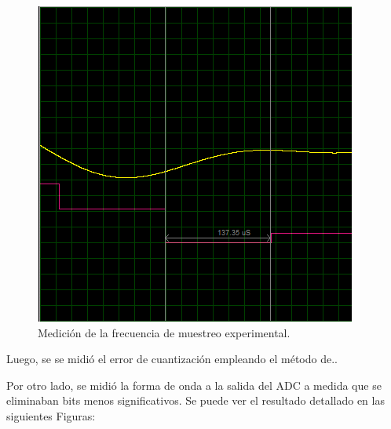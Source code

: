 \begin{multicols}{2}
\begin{figure}[H]
\centering
\includegraphics[width=0.9\linewidth]{ImagenesEjercicio1/med2.png}
\caption{Medición de la frecuencia de muestreo experimental.}
\label{med2}
\end{figure}

\end{multicols}

Luego, se se midió el error de cuantización empleando el método de..


Por otro lado, se midió la forma de onda a la salida del ADC a medida que se eliminaban bits menos significativos. Se puede ver el resultado detallado en las siguientes Figuras:

